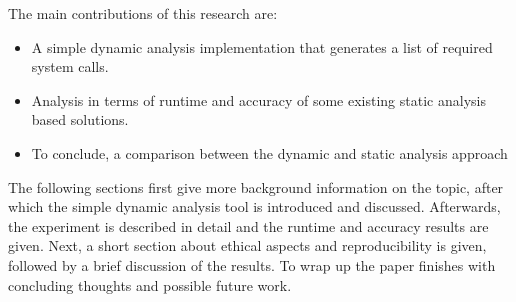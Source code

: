 The main contributions of this research are:
\begin{itemize}
    \item{A simple dynamic analysis implementation that generates a list of required system calls.}
    \item{Analysis in terms of runtime and accuracy of some existing static analysis based solutions.}
    \item{To conclude, a comparison between the dynamic and static analysis approach}
\end{itemize}

The following sections first give more background information on the topic, after which the simple dynamic analysis tool is introduced and discussed.
Afterwards, the experiment is described in detail and the runtime and accuracy results are given.
Next, a short section about ethical aspects and reproducibility is given, followed by a brief discussion of the results.
To wrap up the paper finishes with concluding thoughts and possible future work.

